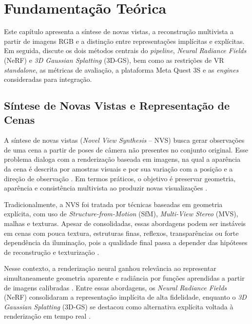 \chapter[Fundamentação Teórica]{Fundamentação Teórica}

Este capítulo apresenta a síntese de novas vistas, a reconstrução multivista a partir de imagens RGB e a distinção entre representações implícitas e explícitas. Em seguida, discute os dois métodos centrais do \textit{pipeline}, \textit{Neural Radiance Fields} (NeRF) e \textit{3D Gaussian Splatting} (3D-GS), bem como as restrições de VR \textit{standalone}, as métricas de avaliação, a plataforma Meta Quest 3S e as \textit{engines} consideradas para integração.

\section{Síntese de Novas Vistas e Representação de Cenas}

A síntese de novas vistas (\textit{Novel View Synthesis} -- NVS) busca gerar observações de uma cena a partir de poses de câmera não presentes no conjunto original. Esse problema dialoga com a renderização baseada em imagens, na qual a aparência da cena é descrita por amostras visuais e por sua variação com a posição e a direção de observação \cite{levoy1996lightfield,gortler1996lumigraph}. Em termos práticos, o objetivo é preservar geometria, aparência e consistência multivista ao produzir novas visualizações \cite{levoy1996lightfield,mildenhall2020,kerbl2023}.

Tradicionalmente, a NVS foi tratada por técnicas baseadas em geometria explícita, com uso de \textit{Structure-from-Motion} (SfM), \textit{Multi-View Stereo} (MVS), malhas e texturas. Apesar de consolidadas, essas abordagens podem ser instáveis em cenas com pouca textura, estruturas finas, reflexos, transparências ou forte dependência da iluminação, pois a qualidade final passa a depender das hipóteses de reconstrução e texturização \cite{seitz2006mvs,schoenberger2016sfm,mildenhall2020}.

Nesse contexto, a renderização neural ganhou relevância ao representar simultaneamente geometria aparente e radiância por funções aprendidas a partir de imagens calibradas \cite{sitzmann2019srn,mildenhall2020}. Entre essas abordagens, os \textit{Neural Radiance Fields} (NeRF) consolidaram a representação implícita de alta fidelidade, enquanto o \textit{3D Gaussian Splatting} (3D-GS) se destacou como alternativa explícita voltada à renderização em tempo real \cite{mildenhall2020,kerbl2023,fei2025survey3dgs}.

